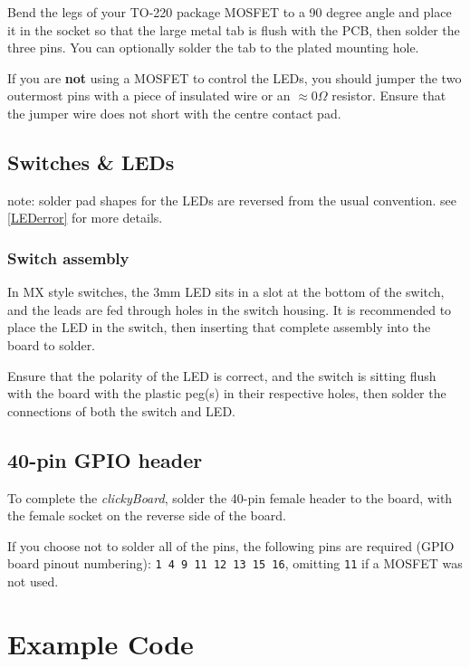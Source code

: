 \documentclass[10pt, a4paper, onesided]{article}
\begin{document}
		Bend the legs of your TO-220 package MOSFET to a 90 degree angle and place it in the socket so that the large metal tab is flush with the PCB, then solder the three pins. You can optionally solder the tab to the plated mounting hole.
		
		If you are \textbf{not} using a MOSFET to control the LEDs, you should jumper the two outermost pins with a piece of insulated wire or an $\approx0 \Omega$ resistor. Ensure that the jumper wire does not short with the centre contact pad.
	
	\subsection*{Switches \& LEDs}
	
		note: solder pad shapes for the LEDs are reversed from the usual convention. see \autoref{LEDerror} for more details.
	
		\subsubsection*{Switch assembly}
	
			In MX style switches, the 3mm LED sits in a slot at the bottom of the switch, and the leads are fed through holes in the switch housing. It is recommended to place the LED in the switch, then inserting that complete assembly into the board to solder.
			
			Ensure that the polarity of the LED is correct, and the switch is sitting flush with the board with the plastic peg(s) in their respective holes, then solder the connections of both the switch and LED.
	
	\subsection*{40-pin GPIO header}
	
		To complete the \textit{clickyBoard}, solder the 40-pin female header to the board, with the female socket on the reverse side of the board.
		
		If you choose not to solder all of the pins, the following pins are required (GPIO board pinout numbering): 
		\texttt{1 4 9 11 12 13 15 16}, omitting \texttt{11} if a MOSFET was not used.


\newpage
\section{Example Code}
\end{document}
